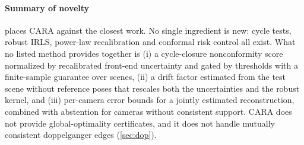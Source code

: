 \paragraph*{Summary of novelty}  places CARA against the closest work. No single ingredient is new: cycle tests, robust IRLS, power-law recalibration and conformal risk control all exist. What no listed method provides together is (i) a cycle-closure nonconformity score normalized by recalibrated front-end uncertainty and gated by thresholds with a finite-sample guarantee over scenes, (ii) a drift factor estimated from the test scene without reference poses that rescales both the uncertainties and the robust kernel, and (iii) per-camera error bounds for a jointly estimated reconstruction, combined with abstention for cameras without consistent support. CARA does not provide global-optimality certificates, and it does not handle mutually consistent doppelganger edges (\cref{sec:dop}).
